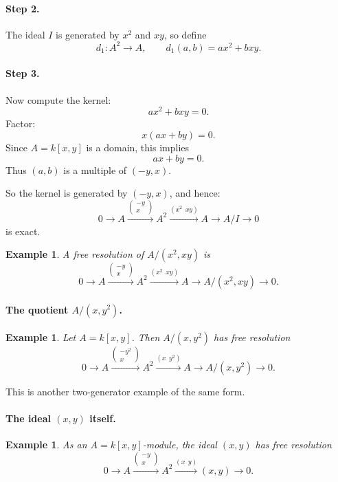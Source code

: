 \documentclass[12pt,a4paper]{article}
\theoremstyle{notespace}
\newtheorem{example}[definition]{Example}
\begin{document}
\paragraph{Step 2.}

The ideal \(I\) is generated by \(x^2\) and \(xy\), so define
\[
d_1:A^2\to A,\qquad d_1(a,b)=ax^2+bxy.
\]

\paragraph{Step 3.}

Now compute the kernel:
\[
ax^2+bxy=0.
\]
Factor:
\[
x(ax+by)=0.
\]
Since \(A=k[x,y]\) is a domain, this implies
\[
ax+by=0.
\]
Thus \((a,b)\) is a multiple of \((-y,x)\).

So the kernel is generated by \((-y,x)\), and hence:
\[
0\to A \xrightarrow{\begin{pmatrix}-y\\x\end{pmatrix}} A^2
\xrightarrow{(x^2\ \ xy)} A \to A/I\to 0
\]
is exact.

\begin{example}
	A free resolution of \(A/(x^2,xy)\) is
	\[
	0\to A \xrightarrow{\begin{pmatrix}-y\\x\end{pmatrix}} A^2
	\xrightarrow{(x^2\ \ xy)} A \to A/(x^2,xy)\to 0.
	\]
\end{example}

\paragraph{The quotient \(A/(x,y^2)\).}

\begin{example}
	Let \(A=k[x,y]\). Then \(A/(x,y^2)\) has free resolution
	\[
	0\to A \xrightarrow{\begin{pmatrix}-y^2\\x\end{pmatrix}} A^2
	\xrightarrow{(x\ \ y^2)} A \to A/(x,y^2)\to 0.
	\]
\end{example}

This is another two-generator example of the same form.

\paragraph{The ideal \((x,y)\) itself.}

\begin{example}
	As an \(A=k[x,y]\)-module, the ideal \((x,y)\) has free resolution
	\[
	0\to A \xrightarrow{\begin{pmatrix}-y\\x\end{pmatrix}} A^2 \xrightarrow{(x\ \ y)} (x,y)\to 0.
	\]
\end{example}
\end{document}
